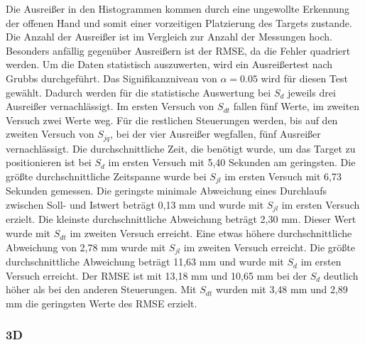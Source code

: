 Die Ausreißer in den Histogrammen kommen durch eine ungewollte Erkennung der offenen Hand und somit einer vorzeitigen Platzierung des Targets zustande. Die Anzahl der Ausreißer ist im Vergleich zur Anzahl der Messungen hoch. Besonders anfällig gegenüber Ausreißern ist der RMSE, da die Fehler quadriert werden. Um die Daten statistisch auszuwerten, wird ein Ausreißertest nach Grubbs durchgeführt. Das Signifikanzniveau von $\alpha=0.05$ wird für diesen Test gewählt. Dadurch werden für die statistische Auswertung bei $S_{d}$ jeweils drei Ausreißer vernachlässigt. Im ersten Versuch von $S_{dt}$ fallen fünf Werte, im zweiten Versuch zwei Werte weg. Für die restlichen Steuerungen werden, bis auf den zweiten Versuch von $S_{jq}$, bei der vier Ausreißer wegfallen, fünf Ausreißer vernachlässigt. Die durchschnittliche Zeit, die benötigt wurde, um das Target zu positionieren ist bei $S_{d}$ im ersten Versuch mit 5,40 Sekunden am geringsten. Die größte durchschnittliche Zeitspanne wurde bei $S_{jl}$ im ersten Versuch mit 6,73 Sekunden gemessen. Die geringste minimale Abweichung eines Durchlaufs zwischen Soll- und Istwert beträgt 0,13 mm und wurde mit $S_{jl}$ im ersten Versuch erzielt. Die kleinste durchschnittliche Abweichung beträgt 2,30 mm. Dieser Wert wurde mit  $S_{dt}$ im zweiten Versuch erreicht. Eine etwas höhere durchschnittliche Abweichung von 2,78 mm wurde mit $S_{jl}$ im zweiten Versuch erreicht. Die größte durchschnittliche Abweichung beträgt 11,63 mm und wurde mit $S_{d}$ im ersten Versuch erreicht. Der RMSE ist mit 13,18 mm und 10,65 mm bei der $S_{d}$ deutlich höher als bei den anderen Steuerungen. Mit $S_{dt}$ wurden mit 3,48 mm und 2,89 mm die geringsten Werte des RMSE erzielt. 

\subsubsection{3D}

